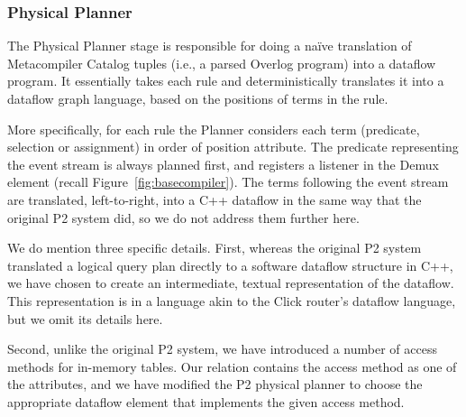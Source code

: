 \subsubsection{Physical Planner}
\label{sec:planner}

The Physical Planner stage is responsible for doing a na\"{i}ve
translation of Metacompiler Catalog tuples (i.e., a parsed Overlog program) into a dataflow program. It essentially takes each rule and deterministically translates it into a dataflow graph language, based on the positions of terms in the rule.

More specifically, for each rule the Planner considers each term
(predicate, selection or assignment) in order of position attribute.
The predicate representing the event stream is always planned first,
and registers a listener in the Demux element (recall
Figure~\ref{fig:basecompiler}).  The terms following the event stream
are translated, left-to-right, into a C++ dataflow in the same way that
the original P2 system did, so we do not address them further here.

We do mention three specific details. First, whereas the original P2
system translated a logical query plan directly to a software dataflow
structure in C++, we have chosen to create an intermediate, textual
representation of the dataflow. This representation is in a language
akin to the Click router's dataflow language, but we omit its details here. 

Second, unlike the original P2
system, we have introduced a number of access methods for in-memory
tables. Our  relation contains the access method as one of
the attributes, and we have modified the P2 physical planner to choose
the appropriate dataflow element that implements the given access
method. 


